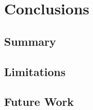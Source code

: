 \chapter{Conclusions}
\label{ch:conclusions}

\section{Summary}
\label{sec:summary}

\section{Limitations}
\label{sec:limitations}

\section{Future Work}
\label{sec:future_work}